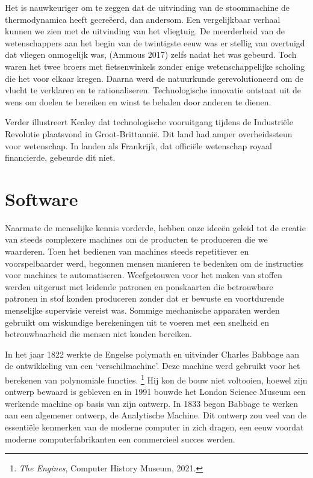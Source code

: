 \documentclass[
  a5paper,
  smalldemyvopaper,11pt,twoside,onecolumn,openright,extrafontsizes,
hidelinks]{memoir}
\begin{document}
Het is nauwkeuriger om te zeggen dat de uitvinding van de stoommachine
de thermodynamica heeft gecreëerd, dan andersom. Een vergelijkbaar
verhaal kunnen we zien met de uitvinding van het vliegtuig. De
meerderheid van de wetenschappers aan het begin van de twintigste eeuw
was er stellig van overtuigd dat vliegen onmogelijk was, (Ammous 2017)
zelfs nadat het was gebeurd. Toch waren het twee broers met
fietsenwinkels zonder enige wetenschappelijke scholing die het voor
elkaar kregen. Daarna werd de natuurkunde gerevolutioneerd om de vlucht
te verklaren en te rationaliseren. Technologische innovatie ontstaat uit
de wens om doelen te bereiken en winst te behalen door anderen te
dienen.

Verder illustreert Kealey dat technologische vooruitgang tijdens de
Industriële Revolutie plaatsvond in Groot-Brittannië. Dit land had amper
overheidssteun voor wetenschap. In landen als Frankrijk, dat officiële
wetenschap royaal financierde, gebeurde dit niet.

\section{Software}\label{software}

Naarmate de menselijke kennis vorderde, hebben onze ideeën geleid tot de
creatie van steeds complexere machines om de producten te produceren die
we waarderen. Toen het bedienen van machines steeds repetitiever en
voorspelbaarder werd, begonnen mensen manieren te bedenken om de
instructies voor machines te automatiseren. Weefgetouwen voor het maken
van stoffen werden uitgerust met leidende patronen en ponskaarten die
betrouwbare patronen in stof konden produceren zonder dat er bewuste en
voortdurende menselijke supervisie vereist was. Sommige mechanische
apparaten werden gebruikt om wiskundige berekeningen uit te voeren met
een snelheid en betrouwbaarheid die mensen niet konden bereiken.

In het jaar 1822 werkte de Engelse polymath en uitvinder Charles Babbage
aan de ontwikkeling van een `verschilmachine'. Deze machine werd
gebruikt voor het berekenen van polynomiale functies. \footnote{\emph{The
  Engines}, Computer History Museum, 2021.} Hij kon de bouw niet
voltooien, hoewel zijn ontwerp bewaard is gebleven en in 1991 bouwde het
London Science Museum een werkende machine op basis van zijn ontwerp. In
1833 begon Babbage te werken aan een algemener ontwerp, de Analytische
Machine. Dit ontwerp zou veel van de essentiële kenmerken van de moderne
computer in zich dragen, een eeuw voordat moderne computerfabrikanten
een commercieel succes werden.
\end{document}

